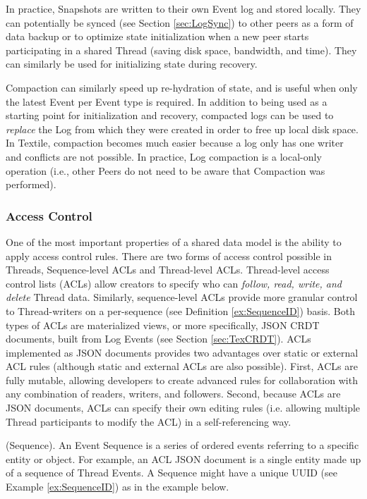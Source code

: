 \documentclass{textile}
\begin{document}
In practice, Snapshots are written to their own Event log and stored locally. They can potentially be synced (see Section \ref{sec:LogSync}) to other peers as a form of data backup or to optimize state initialization when a new peer starts participating in a shared Thread (saving disk space, bandwidth, and time). They can similarly be used for initializing state during recovery.

Compaction can similarly speed up re-hydration of state, and is useful when only the latest Event per Event type is required. In addition to being used as a starting point for initialization and recovery, compacted logs can be used to \emph{replace} the Log from which they were created in order to free up local disk space. In Textile, compaction becomes much easier because a log only has one writer and conflicts are not possible. In practice, Log compaction is a local-only operation (i.e., other Peers do not need to be aware that Compaction was performed).

\subsubsection{Access Control} \label{sec:AccessControl}

One of the most important properties of a shared data model is the ability to apply access control rules. There are two forms of access control possible in Threads, Sequence-level ACLs and Thread-level ACLs. Thread-level access control lists (ACLs) allow creators to specify who can \emph{follow, read, write, and delete} Thread data. Similarly, sequence-level ACLs provide more granular control to Thread-writers on a per-sequence (see Definition \ref{ex:SequenceID}) basis. Both types of ACLs are materialized views, or more specifically, JSON CRDT documents, built from Log Events (see Section \ref{sec:TexCRDT}). ACLs implemented as JSON documents provides two advantages over static or external ACL rules (although static and external ACLs are also possible). First, ACLs are fully mutable, allowing developers to create advanced rules for collaboration with any combination of readers, writers, and followers. Second, because ACLs are JSON documents, ACLs can specify their own editing rules (i.e. allowing multiple Thread participants to modify the ACL) in a self-referencing way.

\begin{definition}
(Sequence). An Event Sequence is a series of ordered events referring to a specific entity or object. For example, an ACL JSON document is a single entity made up of a sequence of Thread Events. A Sequence might have a unique UUID (see Example \ref{ex:SequenceID}) as in the example below.
\end{definition}
\end{document}
